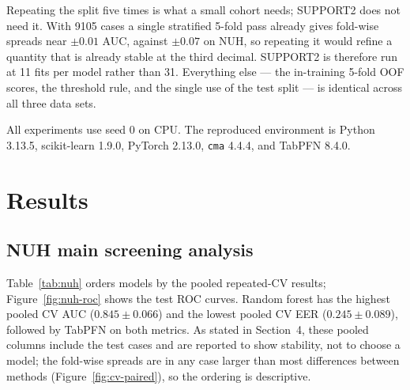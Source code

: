 \documentclass[11pt,a4paper]{article}
\begin{document}
Repeating the split five times is what a small cohort needs; SUPPORT2 does not need it. With 9105 cases a single stratified 5-fold pass already gives fold-wise spreads near $\pm0.01$ AUC, against $\pm0.07$ on NUH, so repeating it would refine a quantity that is already stable at the third decimal. SUPPORT2 is therefore run at 11 fits per model rather than 31. Everything else --- the in-training 5-fold OOF scores, the threshold rule, and the single use of the test split --- is identical across all three data sets.

All experiments use seed 0 on CPU. The reproduced environment is Python 3.13.5, scikit-learn 1.9.0, PyTorch 2.13.0, \texttt{cma} 4.4.4, and TabPFN 8.4.0.

\section{Results}
\subsection{NUH main screening analysis}
Table~\ref{tab:nuh} orders models by the pooled repeated-CV results; Figure~\ref{fig:nuh-roc} shows the test ROC curves. Random forest has the highest pooled CV AUC ($0.845\pm0.066$) and the lowest pooled CV EER ($0.245\pm0.089$), followed by TabPFN on both metrics. As stated in Section~4, these pooled columns include the test cases and are reported to show stability, not to choose a model; the fold-wise spreads are in any case larger than most differences between methods (Figure~\ref{fig:cv-paired}), so the ordering is descriptive.
\end{document}
